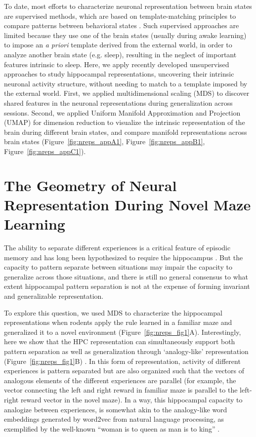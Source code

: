 To date, most efforts to characterize neuronal representation between brain states are supervised methods, which are based on template-matching principles to compare patterns between behavioral states \citep{chaudhuri2019intrinsic, rubin2019revealing}. Such supervised approaches are limited because they use one of the brain states (usually during awake learning) to impose an \textit{a priori} template derived from the external world, in order to analyze another brain state (e.g. sleep), resulting in the neglect of important features intrinsic to sleep. Here, we apply recently developed unsupervised approaches \citep{mcinnes2020umap, bernardi2020geometry} to study hippocampal representations, uncovering their intrinsic neuronal activity structure, without needing to match to a template imposed by the external world. First, we applied multidimensional scaling (MDS) \citep{bernardi2020geometry} to discover shared features in the neuronal representations during generalization across sessions. Second, we applied Uniform Manifold Approximation and Projection (UMAP) for dimension reduction \citep{mcinnes2020umap} to visualize the intrinsic representation of the brain during different brain states, and compare manifold representations across brain states (Figure~\ref{fig:nreps_appA1}, Figure~\ref{fig:nreps_appB1}, Figure~\ref{fig:nreps_appC1}).

\section{The Geometry of Neural Representation During Novel Maze Learning}

The ability to separate different experiences is a critical feature of episodic memory and has long been hypothesized to require the hippocampus \citep{yassa2011pattern}. But the capacity to pattern separate between situations may impair the capacity to generalize across those situations, and there is still no general consensus to what extent hippocampal pattern separation is not at the expense of forming invariant and generalizable representation.

To explore this question, we used MDS to characterize the hippocampal representations when rodents apply the rule learned in a familiar maze and generalized it to a novel environment (Figure~\ref{fig:nreps_fig1}A). Interestingly, here we show that the HPC representation can simultaneously support both pattern separation as well as generalization through `analogy-like' representation (Figure~\ref{fig:nreps_fig1}B) \citep{bernardi2020geometry}. In this form of representation, activity of different experiences is pattern separated but are also organized such that the vectors of analogous elements of the different experiences are parallel (for example, the vector connecting the left and right reward in familiar maze is parallel to the left-right reward vector in the novel maze). In a way, this hippocampal capacity to analogize between experiences, is somewhat akin to the analogy-like word embeddings generated by word2vec from natural language processing, as exemplified by the well-known ``woman is to queen as man is to king'' \citep{mikolov2013efficient}.


